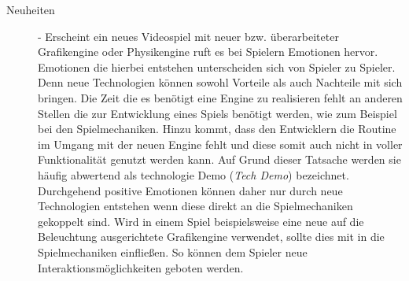 \begin{description}
%
%
\item[Neuheiten] - Erscheint ein neues Videospiel mit neuer bzw. überarbeiteter Grafikengine oder Physikengine ruft es bei Spielern Emotionen hervor. Emotionen die hierbei entstehen unterscheiden sich von Spieler zu Spieler. Denn neue Technologien können sowohl Vorteile als auch Nachteile mit sich bringen. Die Zeit die es benötigt eine Engine zu realisieren fehlt an anderen Stellen die zur Entwicklung eines Spiels benötigt werden, wie zum Beispiel bei den Spielmechaniken. Hinzu kommt, dass den Entwicklern die Routine im Umgang mit der neuen Engine fehlt und diese somit auch nicht in voller Funktionalität genutzt werden kann. Auf Grund dieser Tatsache werden sie häufig abwertend als technologie Demo (\textit{Tech Demo}) bezeichnet. Durchgehend positive Emotionen können daher nur durch neue Technologien entstehen wenn diese direkt an die Spielmechaniken gekoppelt sind. Wird in einem Spiel beispielsweise eine neue auf die Beleuchtung ausgerichtete Grafikengine verwendet, sollte dies mit in die Spielmechaniken einfließen. So können dem Spieler neue Interaktionsmöglichkeiten geboten werden. \cite[S. 27 f.]{Adams:1515529}


\end{description}
